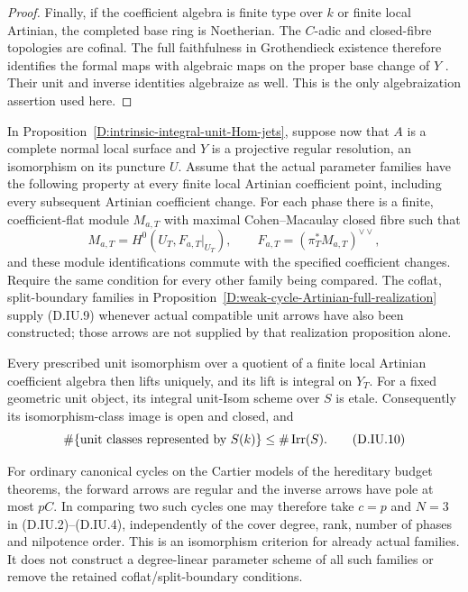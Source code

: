 \begin{proof}
Finally, if the coefficient algebra is finite type over $k$
or finite local Artinian, the completed base ring is
Noetherian. The $C$-adic and closed-fibre topologies are
cofinal. The full faithfulness in Grothendieck existence
therefore identifies the formal maps with algebraic maps
on the proper base change of $Y$
\citep[Theorem 30.27.1, Tag 088E]{StacksIntrinsicUnitHomD}.
Their unit and inverse identities algebraize as well.
This is the only algebraization assertion used here.
\end{proof}

\begin{proposition}
\label{D:canonical-family-unit-Isom-openness}
In Proposition~\ref{D:intrinsic-integral-unit-Hom-jets},
suppose now that $A$ is a complete normal local surface and
$Y$ is a projective regular resolution, an isomorphism on
its puncture $U$. Assume that the actual parameter families
have the following property at every finite local Artinian
coefficient point, including every subsequent Artinian
coefficient change. For each phase there is a finite,
coefficient-flat module $M_{a,T}$ with maximal
Cohen--Macaulay closed fibre such that
\[
 M_{a,T}=H^0(U_T,F_{a,T}|_{U_T}),\qquad
 F_{a,T}=(\pi_T^*M_{a,T})^{\vee\vee},
                                                        \tag{D.IU.9}
\]
and these module identifications commute with the specified
coefficient changes. Require the same condition for every
other family being compared. The coflat, split-boundary
families in Proposition~\ref{D:weak-cycle-Artinian-full-realization}
supply (D.IU.9) whenever actual compatible unit arrows have
also been constructed; those arrows are not supplied by
that realization proposition alone.

Every prescribed unit isomorphism over a quotient of a
finite local Artinian coefficient algebra then lifts uniquely,
and its lift is integral on $Y_T$. For a fixed geometric
unit object, its integral unit-Isom scheme over $S$ is etale.
Consequently its isomorphism-class image is open and closed,
and
\[
 \#\{\hbox{unit classes represented by }S(k)\}
                         \le \#\operatorname{Irr}(S).
                                                        \tag{D.IU.10}
\]

For ordinary canonical cycles on the Cartier models of the
hereditary budget theorems, the forward arrows are regular
and the inverse arrows have pole at most $pC$. In comparing
two such cycles one may therefore take $c=p$ and $N=3$ in
(D.IU.2)--(D.IU.4), independently of the cover degree,
rank, number of phases and nilpotence order. This is an
isomorphism criterion for already actual families. It does
not construct a degree-linear parameter scheme of all such
families or remove the retained coflat/split-boundary
conditions.
\end{proposition}

